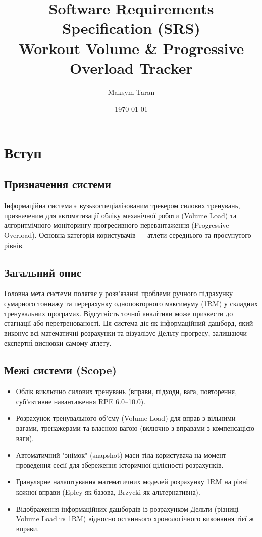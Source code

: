 \documentclass[12pt]{article}
\title{Software Requirements Specification (SRS)\\ \large Workout Volume \& Progressive Overload Tracker}
\author{Maksym Taran}
\date{\today}
\begin{document}
\maketitle
\tableofcontents
\newpage

\section{Вступ}

\subsection{Призначення системи}
Інформаційна система є вузькоспеціалізованим трекером силових тренувань, призначеним для автоматизації обліку механічної роботи (Volume Load) та алгоритмічного моніторингу прогресивного перевантаження (Progressive Overload). Основна категорія користувачів — атлети середнього та просунутого рівнів.

\subsection{Загальний опис}
Головна мета системи полягає у розв'язанні проблеми ручного підрахунку сумарного тоннажу та перерахунку одноповторного максимуму (1RM) у складних тренувальних програмах. Відсутність точної аналітики може призвести до стагнації або перетренованості. Ця система діє як інформаційний дашборд, який виконує всі математичні розрахунки та візуалізує Дельту прогресу, залишаючи експертні висновки самому атлету.

\subsection{Межі системи (Scope)}
\begin{itemize}
    \item Облік виключно силових тренувань (вправи, підходи, вага, повторення, суб'єктивне навантаження RPE 6.0--10.0).
    \item Розрахунок тренувального об'єму (Volume Load) для вправ з вільними вагами, тренажерами та власною вагою (включно з вправами з компенсацією ваги).
    \item Автоматичний "знімок" (snapshot) маси тіла користувача на момент проведення сесії для збереження історичної цілісності розрахунків.
    \item Гранулярне налаштування математичних моделей розрахунку 1RM на рівні кожної вправи (Epley як базова, Brzycki як альтернативна).
    \item Відображення інформаційних дашбордів із розрахунком Дельти (різниці Volume Load та 1RM) відносно останнього хронологічного виконання тієї ж вправи.
\end{itemize}
\end{document}
